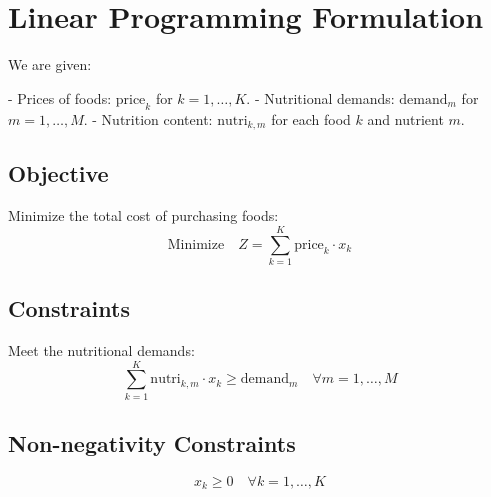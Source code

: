 \documentclass{article}
\begin{document}
\section*{Linear Programming Formulation}

We are given:

- Prices of foods: \(\text{price}_k\) for \(k = 1, \ldots, K\).
- Nutritional demands: \(\text{demand}_m\) for \(m = 1, \ldots, M\).
- Nutrition content: \(\text{nutri}_{k, m}\) for each food \(k\) and nutrient \(m\).

\subsection*{Objective}
Minimize the total cost of purchasing foods:
\[
\text{Minimize} \quad Z = \sum_{k=1}^{K} \text{price}_k \cdot x_k
\]

\subsection*{Constraints}
Meet the nutritional demands:
\[
\sum_{k=1}^{K} \text{nutri}_{k, m} \cdot x_k \geq \text{demand}_m \quad \forall m = 1, \ldots, M
\]

\subsection*{Non-negativity Constraints}
\[
x_k \geq 0 \quad \forall k = 1, \ldots, K
\]
\end{document}
